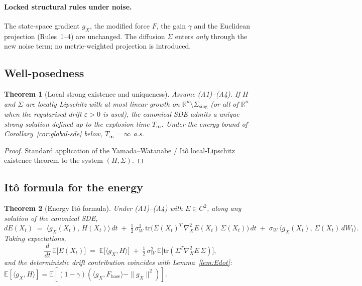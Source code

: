 \documentclass[11pt,oneside]{amsart}
\theoremstyle{plain}
\newtheorem{theorem}{Theorem}[section]
\theoremstyle{definition}
\newcommand{\gX}{g_X}
\newcommand{\Fbase}{F_{\mathrm{base}}}
\newcommand{\R}{\mathbb{R}}
\begin{document}
\paragraph{Locked structural rules under noise.}
The state-space gradient $\gX$, the modified force $F$, the gain
$\gamma$ and the Euclidean projection (Rules~1--4) are unchanged.
The diffusion $\Sigma$ enters \emph{only} through the new noise term;
no metric-weighted projection is introduced.

\subsection{Well-posedness}

\begin{theorem}[Local strong existence and uniqueness]
\label{thm:sde-wp}
Assume \textup{(A1)--(A4)}. If $H$ and $\Sigma$ are locally Lipschitz
with at most linear growth on $\R^n\setminus\Sigma_{\mathrm{sing}}$
(or all of $\R^n$ when the regularised drift $\varepsilon>0$ is used),
the canonical SDE admits a unique strong solution defined up to the
explosion time $T_\infty$. Under the energy bound of
Corollary~\ref{cor:global-sde} below, $T_\infty=\infty$ a.s.
\end{theorem}

\begin{proof}
Standard application of the Yamada--Watanabe / It\^o local-Lipschitz
existence theorem to the system $(H,\Sigma)$.
\end{proof}

\subsection{It\^o formula for the energy}

\begin{theorem}[Energy It\^o formula]
\label{thm:ito-E}
Under (A1)--(A4) with $E\in C^2$, along any solution of the canonical
SDE,
\[
  dE(X_t) \;=\; \bigl\langle \gX(X_t),\, H(X_t)\bigr\rangle\,dt
        \;+\; \tfrac{1}{2}\,\sigma_W^{2}\,
              \mathrm{tr}\!\bigl(\Sigma(X_t)^{T}\,\nabla^{2}_{X}E(X_t)\,\Sigma(X_t)\bigr)\,dt
        \;+\; \sigma_W\,\bigl\langle \gX(X_t),\, \Sigma(X_t)\,dW_t\bigr\rangle.
\]
Taking expectations,
\[
  \frac{d}{dt}\,\mathbb{E}\bigl[E(X_t)\bigr]
  \;=\; \mathbb{E}\bigl[\langle \gX, H\rangle\bigr]
        \;+\; \tfrac{1}{2}\,\sigma_W^{2}\,
              \mathbb{E}\bigl[\mathrm{tr}(\Sigma^{T}\nabla^{2}_{X}E\,\Sigma)\bigr],
\]
and the deterministic drift contribution coincides with
Lemma~\ref{lem:Edot}: $\mathbb{E}[\langle\gX,H\rangle]
= \mathbb{E}[(1-\gamma)(\langle\gX,\Fbase\rangle - \|\gX\|^2)]$.
\end{theorem}
\end{document}
